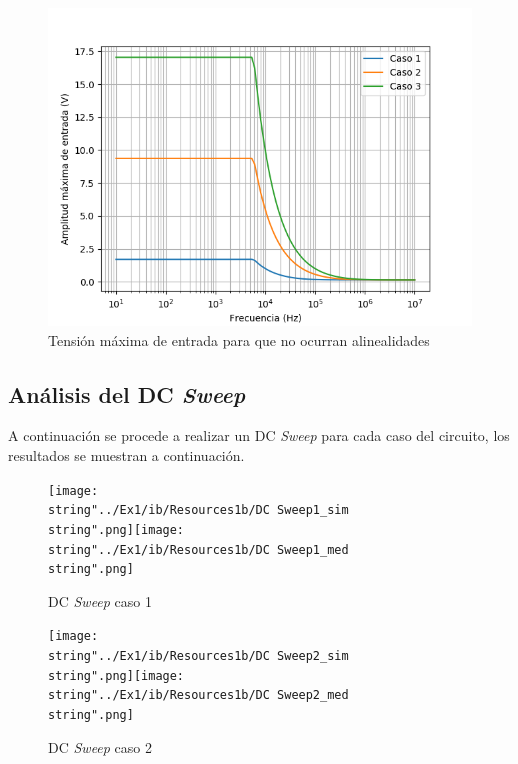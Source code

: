\begin{figure}[H]
\begin{centering}
\includegraphics[scale=0.5]{../Ex1/ib/Resources1b/AmplMaxVsFreq123}
\par\end{centering}
\caption{Tensión máxima de entrada para que no ocurran alinealidades}
\label{1_b_30}
\end{figure}

\subsection{Análisis del DC \emph{Sweep}}

A continuación se procede a realizar un DC \emph{Sweep} para cada
caso del circuito, los resultados se muestran a continuación.

\begin{figure}[H]
\begin{centering}
\texttt{[image: \\string"../Ex1/ib/Resources1b/DC Sweep1\_sim\\string".png]}\texttt{[image: \\string"../Ex1/ib/Resources1b/DC Sweep1\_med\\string".png]}
\par\end{centering}
\caption{DC \emph{Sweep} caso 1}
\end{figure}

\begin{figure}[H]
\begin{centering}
\texttt{[image: \\string"../Ex1/ib/Resources1b/DC Sweep2\_sim\\string".png]}\texttt{[image: \\string"../Ex1/ib/Resources1b/DC Sweep2\_med\\string".png]}
\par\end{centering}
\caption{DC \emph{Sweep} caso 2}
\end{figure}

